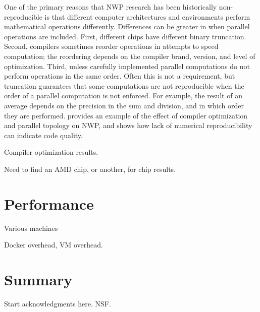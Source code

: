 \documentclass[draft]{ametsoc}
\begin{document}
One of the primary reasons that NWP research has been historically non-reproducible is that different computer architectures and environments perform mathematical operations differently.  Differences can be greater in when parallel operations are included.  First, different chips have different binary truncation. Second, compilers sometimes reorder operations in attempts to speed computation; the reordering depends on the compiler brand, version, and level of optimization.  Third, unless carefully implemented parallel computations do not perform operations in the same order.  Often this is not a requirement, but truncation guarantees that some computations are not reproducible when the order of a parallel computation is not enforced. For example, the result of an average depends on the precision in the sum and division, and in which order they are performed.  \citet{Thomas02} provides an example of the effect of compiler optimization and parallel topology on NWP, and \citet{Baker:2015} shows how lack of numerical reproducibility can indicate code quality.

Compiler optimization results.

Need to find an AMD chip, or another, for chip results.

\section{Performance}

Various machines

Docker overhead, VM overhead.

\section{Summary}


%
\acknowledgments
Start acknowledgments here. NSF.

%



\end{document}
